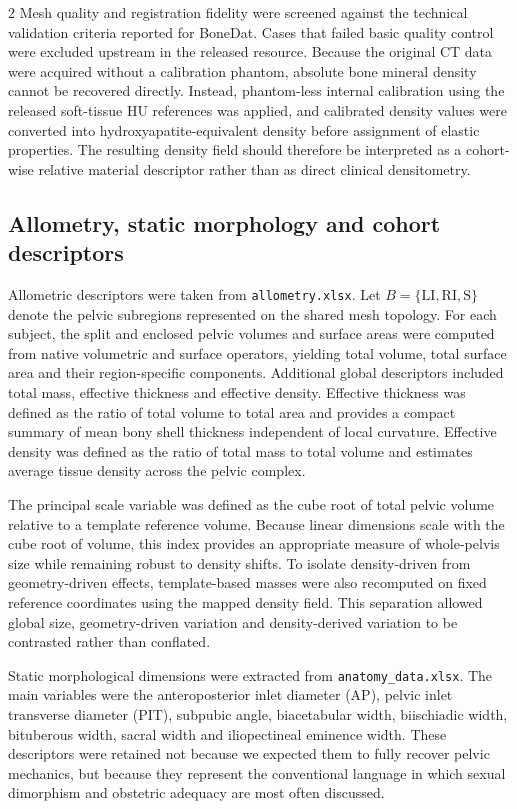 \documentclass[openacc]{rsproca_new}
\begin{document}
\begin{multicols}{2}
Mesh quality and registration fidelity were screened against the technical validation criteria reported for BoneDat. Cases that failed basic quality control were excluded upstream in the released resource. Because the original CT data were acquired without a calibration phantom, absolute bone mineral density cannot be recovered directly. Instead, phantom-less internal calibration using the released soft-tissue HU references was applied, and calibrated density values were converted into hydroxyapatite-equivalent density before assignment of elastic properties. The resulting density field should therefore be interpreted as a cohort-wise relative material descriptor rather than as direct clinical densitometry.

\subsection{Allometry, static morphology and cohort descriptors}

Allometric descriptors were taken from \texttt{allometry.xlsx}. Let $B=\{\mathrm{LI},\mathrm{RI},\mathrm{S}\}$ denote the pelvic subregions represented on the shared mesh topology. For each subject, the split and enclosed pelvic volumes and surface areas were computed from native volumetric and surface operators, yielding total volume, total surface area and their region-specific components. Additional global descriptors included total mass, effective thickness and effective density. Effective thickness was defined as the ratio of total volume to total area and provides a compact summary of mean bony shell thickness independent of local curvature. Effective density was defined as the ratio of total mass to total volume and estimates average tissue density across the pelvic complex.

The principal scale variable was defined as the cube root of total pelvic volume relative to a template reference volume. Because linear dimensions scale with the cube root of volume, this index provides an appropriate measure of whole-pelvis size while remaining robust to density shifts. To isolate density-driven from geometry-driven effects, template-based masses were also recomputed on fixed reference coordinates using the mapped density field. This separation allowed global size, geometry-driven variation and density-derived variation to be contrasted rather than conflated.

Static morphological dimensions were extracted from \texttt{anatomy\_data.xlsx}. The main variables were the anteroposterior inlet diameter (AP), pelvic inlet transverse diameter (PIT), subpubic angle, biacetabular width, biischiadic width, bituberous width, sacral width and iliopectineal eminence width. These descriptors were retained not because we expected them to fully recover pelvic mechanics, but because they represent the conventional language in which sexual dimorphism and obstetric adequacy are most often discussed.


\end{multicols}
\end{document}
